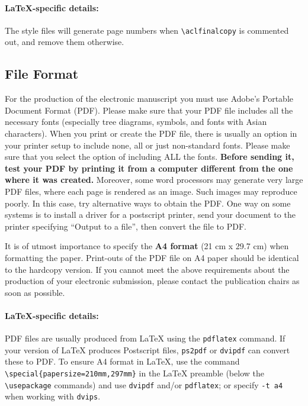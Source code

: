\documentclass[11pt,a4paper]{article}
\begin{document}
\paragraph{\LaTeX-specific details:}
The style files will generate page numbers when {\small\verb|\aclfinalcopy|} is commented out, and remove them otherwise.


\subsection{File Format}
\label{sect:pdf}

For the production of the electronic manuscript you must use Adobe's Portable Document Format (PDF).
Please make sure that your PDF file includes all the necessary fonts (especially tree diagrams, symbols, and fonts with Asian characters).
When you print or create the PDF file, there is usually an option in your printer setup to include none, all or just non-standard fonts.
Please make sure that you select the option of including ALL the fonts.
\textbf{Before sending it, test your PDF by printing it from a computer different from the one where it was created.}
Moreover, some word processors may generate very large PDF files, where each page is rendered as an image.
Such images may reproduce poorly.
In this case, try alternative ways to obtain the PDF.
One way on some systems is to install a driver for a postscript printer, send your document to the printer specifying ``Output to a file'', then convert the file to PDF.

It is of utmost importance to specify the \textbf{A4 format} (21 cm x 29.7 cm) when formatting the paper.
Print-outs of the PDF file on A4 paper should be identical to the hardcopy version.
If you cannot meet the above requirements about the production of your electronic submission, please contact the publication chairs as soon as possible.

\paragraph{\LaTeX-specific details:}
PDF files are usually produced from \LaTeX{} using the \texttt{\small pdflatex} command.
If your version of \LaTeX{} produces Postscript files, \texttt{\small ps2pdf} or \texttt{\small dvipdf} can convert these to PDF.
To ensure A4 format in \LaTeX, use the command {\small\verb|\special{papersize=210mm,297mm}|}
in the \LaTeX{} preamble (below the {\small\verb|\usepackage|} commands) and use \texttt{\small dvipdf} and/or \texttt{\small pdflatex}; or specify \texttt{\small -t a4} when working with \texttt{\small dvips}.
\end{document}
